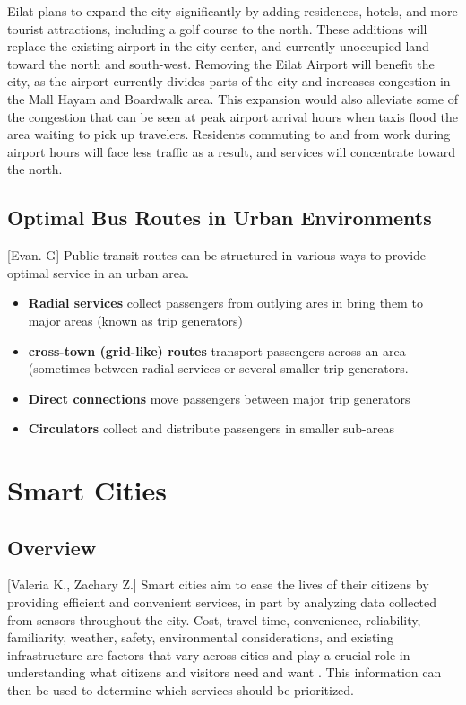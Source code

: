 \documentclass[12pt]{article}                               %
\begin{document}
Eilat plans to expand the city significantly by adding residences, hotels, and more tourist attractions, including a golf course to the north. These additions will replace the existing airport in the city center, and currently unoccupied land toward the north and south-west. Removing the Eilat Airport will benefit the city, as the airport currently divides parts of the city and increases congestion in the Mall Hayam and Boardwalk area. This expansion would also alleviate some of the congestion that can be seen at peak airport arrival hours when taxis flood the area waiting to pick up travelers. Residents commuting to and from work during airport hours will face less traffic as a result, and services will concentrate toward the north. 

\subsection{Optimal Bus Routes in Urban Environments}[Evan. G]
Public transit routes can be structured in various ways to provide optimal service in an urban area. 
\begin{itemize}
    \item \textbf{Radial services} collect passengers from outlying ares in bring them to major areas (known as trip generators)
    \item \textbf{cross-town (grid-like) routes} transport passengers across an area (sometimes between radial services or several smaller trip generators.
    \item \textbf{Direct connections} move passengers between major trip generators
    \item \textbf{Circulators} collect and distribute passengers in smaller sub-areas
\end{itemize}

\newpage
\section{Smart Cities}\label{sec:smart_cities}
\subsection{Overview}[Valeria K., Zachary Z.]
Smart cities aim  to ease the lives of their citizens by providing efficient and convenient services, in part by analyzing data collected from sensors throughout the city. Cost, travel time, convenience, reliability, familiarity, weather, safety, environmental considerations, and existing infrastructure are factors that vary across cities and play a crucial role in understanding what citizens and visitors need and want \cite{2016LiveChallenge}. This information can then be used to determine which services should be prioritized.
\end{document}
